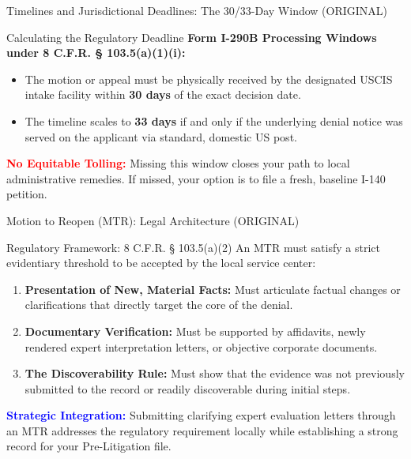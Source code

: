 \documentclass[11pt]{beamer}
\begin{document}
	\begin{frame}{Timelines and Jurisdictional Deadlines: The 30/33-Day Window (ORIGINAL)}
		\scriptsize
		\begin{block}{Calculating the Regulatory Deadline}
			\textbf{Form I-290B Processing Windows under 8 C.F.R. § 103.5(a)(1)(i):}
			\begin{itemize}
				\item The motion or appeal must be physically received by the designated USCIS intake facility within \textbf{30 days} of the exact decision date.
				\item The timeline scales to \textbf{33 days} if and only if the underlying denial notice was served on the applicant via standard, domestic US post.
			\end{itemize}
			\textcolor{red}{\textbf{No Equitable Tolling:}} Missing this window closes your path to local administrative remedies. If missed, your option is to file a fresh, baseline I-140 petition.
		\end{block}
	\end{frame}
	
	
	\begin{frame}{Motion to Reopen (MTR): Legal Architecture (ORIGINAL)}
		\scriptsize
		\begin{block}{Regulatory Framework: 8 C.F.R. § 103.5(a)(2)}
			An MTR must satisfy a strict evidentiary threshold to be accepted by the local service center:
			\begin{enumerate}
				\item \textbf{Presentation of New, Material Facts:} Must articulate factual changes or clarifications that directly target the core of the denial.
				\item \textbf{Documentary Verification:} Must be supported by affidavits, newly rendered expert interpretation letters, or objective corporate documents.
				\item \textbf{The Discoverability Rule:} Must show that the evidence was not previously submitted to the record or readily discoverable during initial steps.
			\end{enumerate}
			\vspace{0.1cm}
			\textcolor{blue}{\textbf{Strategic Integration:}} Submitting clarifying expert evaluation letters through an MTR addresses the regulatory requirement locally while establishing a strong record for your Pre-Litigation file.
		\end{block}
	\end{frame}
	
\end{document}
